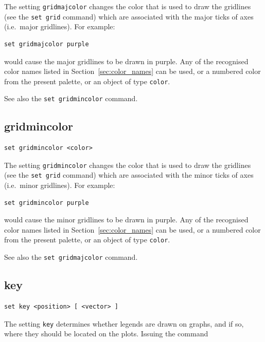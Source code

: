 The setting {\tt gridmajcolor} changes the color that is used to draw the
gridlines (see the {\tt set grid} command) which are associated with the major
ticks of axes (i.e.\ major gridlines). For example:

\begin{verbatim}
set gridmajcolor purple
\end{verbatim}

\noindent would cause the major gridlines to be drawn in purple. Any of the
recognised color names listed in Section~\ref{sec:color_names} can be used, or a numbered color from the present palette, or an object of type {\tt color}.

See also the {\tt set gridmincolor} command.


\subsection{gridmincolor}

\begin{verbatim}
set gridmincolor <color>
\end{verbatim}

The setting {\tt gridmincolor} changes the color that is used to draw the
gridlines (see the {\tt set grid} command) which are associated with the minor
ticks of axes (i.e.\ minor gridlines). For example:

\begin{verbatim}
set gridmincolor purple
\end{verbatim}

\noindent would cause the minor gridlines to be drawn in purple. Any of the
recognised color names listed in Section~\ref{sec:color_names} can be used, or a numbered color from the present palette, or an object of type {\tt color}.

See also the {\tt set gridmajcolor} command.


\subsection{key}

\begin{verbatim}
set key <position> [ <vector> ]
\end{verbatim}

The setting {\tt key} determines whether legends are drawn on graphs, and if
so, where they should be located on the plots. Issuing the command

